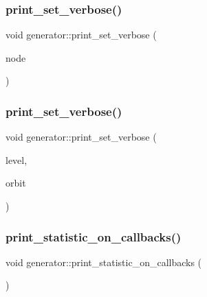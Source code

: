 \mbox{\label{classgenerator_a223818691e87880f6874244e3c129f34}} 
\subsubsection{\texorpdfstring{print\+\_\+set\+\_\+verbose()}{print\_set\_verbose()}\hspace{0.1cm}{\footnotesize\ttfamily [1/2]}}
{\footnotesize\ttfamily void generator\+::print\+\_\+set\+\_\+verbose (\begin{DoxyParamCaption}\item[{\mbox{\hyperlink{galois_8h_a09fddde158a3a20bd2dcadb609de11dc}{I\+NT}}}]{node }\end{DoxyParamCaption})}

\mbox{\label{classgenerator_a8b169a6d998735a44526cdd927f8b9f8}} 
\subsubsection{\texorpdfstring{print\+\_\+set\+\_\+verbose()}{print\_set\_verbose()}\hspace{0.1cm}{\footnotesize\ttfamily [2/2]}}
{\footnotesize\ttfamily void generator\+::print\+\_\+set\+\_\+verbose (\begin{DoxyParamCaption}\item[{\mbox{\hyperlink{galois_8h_a09fddde158a3a20bd2dcadb609de11dc}{I\+NT}}}]{level,  }\item[{\mbox{\hyperlink{galois_8h_a09fddde158a3a20bd2dcadb609de11dc}{I\+NT}}}]{orbit }\end{DoxyParamCaption})}

\mbox{\label{classgenerator_aaed300cc45b7045e96ff4a95265c9a61}} 
\subsubsection{\texorpdfstring{print\+\_\+statistic\+\_\+on\+\_\+callbacks()}{print\_statistic\_on\_callbacks()}}
{\footnotesize\ttfamily void generator\+::print\+\_\+statistic\+\_\+on\+\_\+callbacks (\begin{DoxyParamCaption}{ }\end{DoxyParamCaption})}

